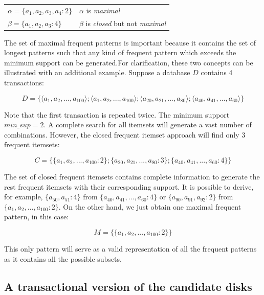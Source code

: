 \documentclass[10pt]{scrartcl}
\begin{document}
\vspace{2mm}
\begin{tabular}{l l}
$\alpha = \{ a_1, a_2, a_3, a_4 : 2\}$ & $\alpha$ is \textit{maximal} \\
$\beta = \{ a_1, a_2, a_3 : 4\}$ & $\beta$ is \textit{closed} but not \textit{maximal} \\
\end{tabular}
\vspace{2mm}

The set of maximal frequent patterns is important because it contains the set of longest patterns such that any kind of frequent pattern which exceeds the minimum support can be generated.For clarification, these two concepts can be illustrated with an additional example.  Suppose a database $D$ contains 4 transactions:

$$ D = \{ \langle a_1, a_2, ..., a_{100} \rangle; \langle a_1, a_2, ..., a_{100} \rangle; \langle a_{20}, a_{21}, ..., a_{80} \rangle; \langle a_{40}, a_{41}, ..., a_{60} \rangle \} $$

Note that the first transaction is repeated twice. The minimum support $min\_sup = 2$. A complete search for all itemsets will generate a vast number of combinations. However,
the closed frequent itemset approach will find only 3 frequent itemsets:

$$ C = \{ \{ a_1, a_2, ..., a_{100} : 2 \};\{ a_{20},a_{21}, ..., a_{80} : 3 \};\{ a_{40},a_{41}, ..., a_{60} : 4 \} \} $$

The set of closed frequent itemsets contains complete information to generate the rest frequent itemsets with their corresponding support. It is possible to derive, for example,
$\{a_{50}, a_{51} : 4\}$ from $\{a_{40}, a_{41} , ..., a_{60} : 4\}$ or $\{a_{90}, a_{91}, a_{92} : 2\}$ from $\{a_1, a_2, ..., a_{100} : 2\}$.
On the other hand, we just obtain one maximal frequent pattern, in this case:

$$ M = \{ \{ a_1, a_2, ..., a_{100} : 2 \} \} $$

This only pattern will serve as a valid representation of all the frequent patterns as it contains all the possible subsets.

\subsection*{A transactional version of the candidate disks}
\end{document}
